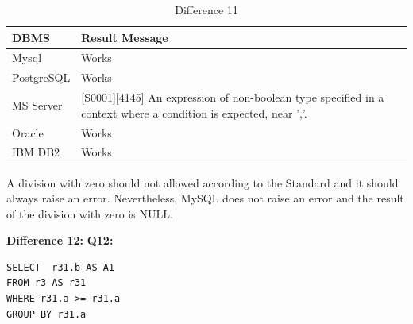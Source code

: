 \begin{table}[h]
\centering
\caption{Difference 11}
\label{my-label}
\begin{tabular}{|p{2cm}|p{11.5cm}|}
\hline
\textbf{DBMS} & \textbf{Result Message}                                                                                                 \\ \hline
Mysql         & Works                                                                                                                   \\ \hline
PostgreSQL    & Works                                                                                                                   \\ \hline
MS Server     & {[}S0001{]}{[}4145{]} An expression of non-boolean type specified in a context where a condition is expected, near ','. \\ \hline
Oracle        & Works                                                                                                                   \\ \hline
IBM DB2       & Works                                                                                                                   \\ \hline
\end{tabular}
\end{table}

A division with zero should not allowed  according to the Standard and it should  always raise an error. Nevertheless, MySQL does not raise an error and the result of the division with zero is NULL. 


\hfill\newline\textbf{Difference 12:}
\hfill\newline\textbf{Q12:}

\begin{mdframed}[backgroundcolor=lightgray!20]
\begin{lstlisting}[style=SQL]
SELECT  r31.b AS A1
FROM r3 AS r31
WHERE r31.a >= r31.a
GROUP BY r31.a
\end{lstlisting}
\end{mdframed}
 
